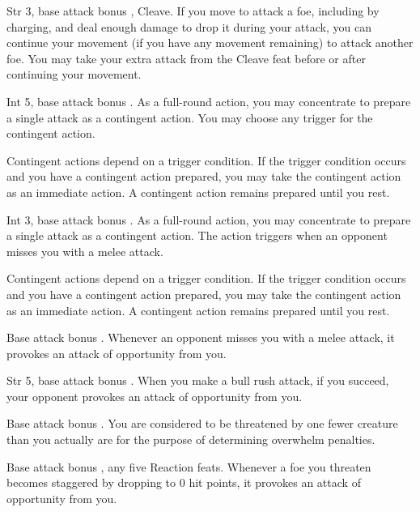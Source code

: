  Str 3, base attack bonus , Cleave.
 If you move to attack a foe, including by charging, and deal enough damage to drop it during your attack, you can continue your movement (if you have any movement remaining) to attack another foe. You may take your extra attack from the Cleave feat before or after continuing your movement.

\featpre Int 5, base attack bonus .
\featben As a full-round action, you may concentrate to prepare a single attack as a contingent action. You may choose any trigger for the contingent action.

Contingent actions depend on a trigger condition. If the trigger condition occurs and you have a contingent action prepared, you may take the contingent action as an immediate action. A contingent action remains prepared until you rest.

\featpre Int 3, base attack bonus .
\featben As a full-round action, you may concentrate to prepare a single attack as a contingent action. The action triggers when an opponent misses you with a melee attack.

Contingent actions depend on a trigger condition. If the trigger condition occurs and you have a contingent action prepared, you may take the contingent action as an immediate action. A contingent action remains prepared until you rest.

\featpre Base attack bonus .
\featben Whenever an opponent misses you with a melee attack, it provokes an attack of opportunity from you.

\featpre Str 5, base attack bonus .
\featben When you make a bull rush attack, if you succeed, your opponent provokes an attack of opportunity from you.

 Base attack bonus .
 You are considered to be threatened by one fewer creature than you actually are for the purpose of determining overwhelm penalties.

 Base attack bonus , any five Reaction feats.
 Whenever a foe you threaten becomes staggered by dropping to 0 hit points, it provokes an attack of opportunity from you.

